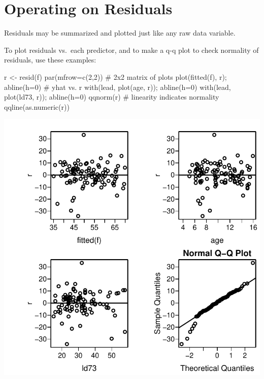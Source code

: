 \section{Operating on Residuals}
Residuals may be summarized and plotted just like any raw data
variable.
\bi
\item To plot residuals vs.\ each predictor, and to make a q-q plot to check normality of residuals, use these examples:
\begin{Schunk}
\begin{Sinput}
r <- resid(f)
par(mfrow=c(2,2))   # 2x2 matrix of plots
plot(fitted(f), r); abline(h=0)  # yhat vs. r
with(lead, plot(age,  r));    abline(h=0)
with(lead, plot(ld73, r));    abline(h=0)
qqnorm(r)           # linearity indicates normality
qqline(as.numeric(r))
\end{Sinput}


\centerline{\includegraphics[width=\maxwidth]{rmsintro-unnamed-chunk-7-1} }

\end{Schunk}
\ei

